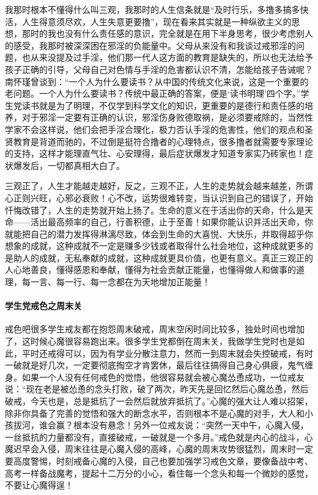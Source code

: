 我那时根本不懂得什么叫三观，我那时的人生信条就是“及时行乐，多撸多搞多快活，人生得意须尽欢，人生失意更要撸”，现在看来其实就是一种纵欲主义的思想，那时的我也没有什么责任感的意识，完全就是在用下半身思考，很少考虑别人的感受，我那时被深深困在邪淫的负能量中。父母从来没有和我谈过戒邪淫的问题，也从来没提及过手淫，他们那一代人这方面的教育是缺失的，所以也无法给予孩子正确的引导，父母自己对色情与手淫的危害都认识不清，怎能给孩子告诫呢？南怀瑾曾谈到：“一个人为什么要读书？从中国的传统文化来说，这是一个重要的老问题。一个人为什么要读书？传统中最正确的答案，便是‘读书明理’四个字。”学生党读书就是为了明理，不仅学到科学文化的知识，更重要的是德行和责任感的培养，对于邪淫一定要有正确的认识，邪淫伤身败德取祸，是必须要戒除的，当然性学家不会这样说，他们会把手淫合理化，极力否认手淫的危害性，他们的观点和圣贤教育是背道而驰的，不过倒是挺符合撸者的心理特点，很多撸者就需要专家理论的支持，这样才能理直气壮、心安理得，最后症状爆发才知道专家实乃砖家也！症状爆发后，一切都真相大白了。

三观正了，人生才能越走越好，反之，三观不正，人生的走势就会越来越差，所谓心正则兴旺，心邪必衰败！心不改，运势很难转变，当认识到自己的错误了，开始忏悔改错了，人生的走势就开始上扬了。生命的意义在于活出你的天命，什么是天命——活出最高频率的自己，行善积德，止于至善！如果你能认识并活出天命，你就能把自己的潜力发挥得淋漓尽致，体会到生命的大喜悦、大快乐，并取得超乎你想象的成就，这种成就不一定是赚多少钱或者取得什么社会地位，这种成就更多的是助人的成就，无私奉献的成就，这种成就更具价值，也更有意义。真正三观正的人心地善良，懂得感恩和奉献，懂得为社会贡献正能量，也懂得做人和做事的道理，每一言、每一行、每一念都在为天地增加正能量！

\paragraph{学生党戒色之周末关}

戒色吧很多学生戒友都在抱怨周末破戒，周末空闲时间比较多，独处时间也增加了，这时候心魔很容易跑出来。很多学生党都倒在周末关，我做学生党时也是如此，平时还戒得可以，因为有学业分散注意力，然而一到周末就会失控破戒，有时一破就是好几次，一定要彻底掏空才肯罢休，最后往往搞得自己身心俱疲，鬼气缠身。如果一个人没有任何戒色的觉悟，他很容易就会被心魔怂恿成功，一位戒友说：“现在老是被怂恿的念头打败，破了两次，昨天先是回忆然后心魔怂恿，然后破戒，今天也是，总是抵抗了一会然后就放弃抵抗了。”心魔的强大让人难以招架，除非你具备了完善的觉悟和强大的断念水平，否则根本不是心魔的对手，大人和小孩拔河，谁会赢？根本没有悬念！另外一位戒友说：“突然一天中午，心魔入侵，一丝抵抗的力量都没有，直接破戒，一破就是一个多月。”戒色就是内心的战斗，心魔迟早会入侵，周末往往是心魔入侵的高峰，心魔的周末攻势很猛烈，周末时一定要高度警惕，时刻戒备心魔的入侵，自己也要加强学习戒色文章，要像备战中考、高考一样备战魔考，提起十二万分的小心，看住每一个念头和每一个微妙的感觉，不要让心魔得逞！

